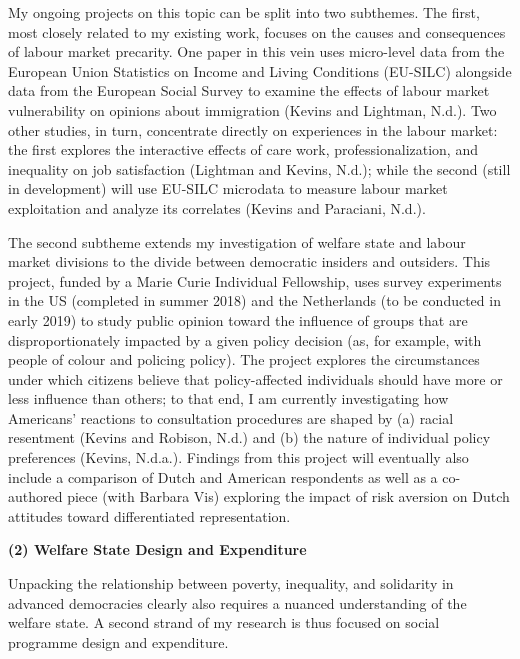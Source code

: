 \documentclass[letterpaper]{scrartcl}
\begin{document}
  My ongoing projects on this topic can be split into two subthemes. The first, most closely related to my existing work, focuses on the causes and consequences of labour market precarity. One paper in this vein uses micro-level data from the European Union Statistics on Income and Living Conditions (EU-SILC) alongside data from the European Social Survey to examine the effects of labour market vulnerability on opinions about immigration (Kevins and Lightman, N.d.). Two other studies, in turn, concentrate directly on experiences in the labour market: the first explores the interactive effects of care work, professionalization, and inequality on job satisfaction (Lightman and Kevins, N.d.); while the second (still in development) will use EU-SILC microdata to measure labour market exploitation and analyze its correlates (Kevins and Paraciani, N.d.).

  The second subtheme extends my investigation of welfare state and labour market divisions to the divide between democratic insiders and outsiders. This project, funded by a Marie Curie Individual Fellowship, uses survey experiments in the US (completed in summer 2018) and the Netherlands (to be conducted in early 2019) to study public opinion toward the influence of groups that are disproportionately impacted by a given policy decision (as, for example, with people of colour and policing policy). The project explores the circumstances under which citizens believe that policy-affected individuals should have more or less influence than others; to that end, I am currently investigating how Americans' reactions to consultation procedures are shaped by (a) racial resentment (Kevins and Robison, N.d.) and (b) the nature of individual policy preferences (Kevins, N.d.a.). Findings from this project will eventually also include a comparison of Dutch and American respondents as well as a co-authored piece (with Barbara Vis) exploring the impact of risk aversion on Dutch attitudes toward differentiated representation.

  \textbf{(2) Welfare State Design and Expenditure}
  \vspace{-1em}

  Unpacking the relationship between poverty, inequality, and solidarity in advanced democracies clearly also requires a nuanced understanding of the welfare state. A second strand of my research is thus focused on social programme design and expenditure.
\end{document}
